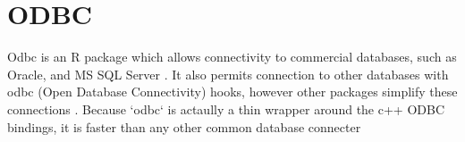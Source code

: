 \section{ODBC}

Odbc is an R package which allows connectivity to commercial databases, such as
Oracle, and MS SQL Server \cite{hid-sp18-403-R-odbc}. It also permits
connection to other databases with odbc (Open Database Connectivity) hooks,
however other packages simplify these connections \cite{hid-sp18-403-R-dbi}.
Because `odbc` is actaully a thin wrapper around the c++ ODBC bindings, it is
faster than any other common database connecter \cite{rstudio-odbc}
